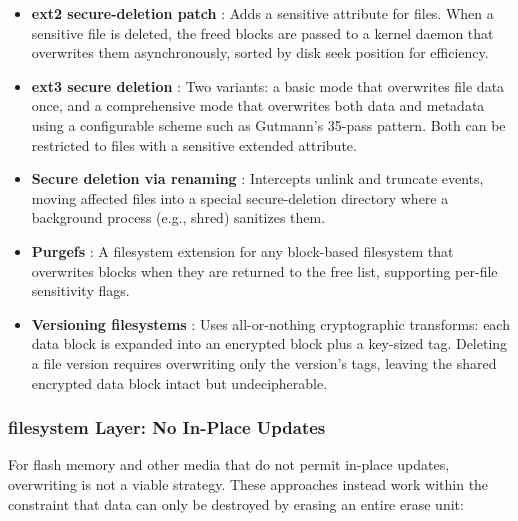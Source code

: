 \begin{itemize}
    \item \textbf{ext2 secure-deletion patch} : Adds a sensitive attribute for files. When a 
    sensitive file is deleted, the freed blocks are passed to a kernel daemon that overwrites them 
    asynchronously, sorted by disk seek position for efficiency.

    \item \textbf{ext3 secure deletion} : Two variants: a basic mode that overwrites file data once, 
    and a comprehensive mode that overwrites both data and metadata using a configurable scheme such 
    as Gutmann's 35-pass pattern. Both can be restricted to files with a sensitive extended attribute.

    \item \textbf{Secure deletion via renaming} : Intercepts unlink and truncate events, moving 
    affected files into a special secure-deletion directory where a background process (e.g., shred) 
    sanitizes them.

    \item \textbf{Purgefs} : A filesystem extension for any block-based filesystem that overwrites 
    blocks when they are returned to the free list, supporting per-file sensitivity flags.

    \item \textbf{Versioning filesystems} : Uses all-or-nothing cryptographic transforms: each data 
    block is expanded into an encrypted block plus a key-sized tag. Deleting a file version requires 
    overwriting only the version's tags, leaving the shared encrypted data block intact but 
    undecipherable.

\end{itemize}

\subsubsection{filesystem Layer: No In-Place Updates}
For flash memory and other media that do not permit in-place updates, overwriting is not a viable 
strategy. These approaches instead work within the constraint that data can only be destroyed by 
erasing an entire erase unit:

